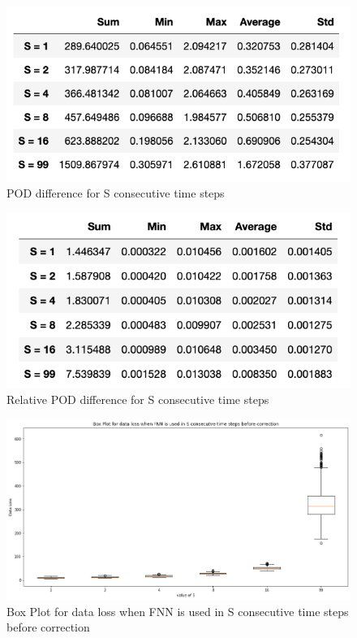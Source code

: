 \begin{figure}[H]
    \caption{POD difference for S consecutive time steps}
    \includegraphics[scale=0.7]{figures/mantle_convection_images/further_testings/POD_table.png}
\end{figure}

\begin{figure}[H]
    \caption{Relative POD difference for S consecutive time steps}
    \includegraphics[scale=0.7]{figures/mantle_convection_images/further_testings/Relative_POD_table.png}
\end{figure}

\begin{figure}[H]
    \caption{Box Plot for data loss when FNN is used in S consecutive time steps before correction}
    \includegraphics[scale=0.4]{figures/mantle_convection_images/further_testings/Data_Loss_boxplot.png}
\end{figure}

